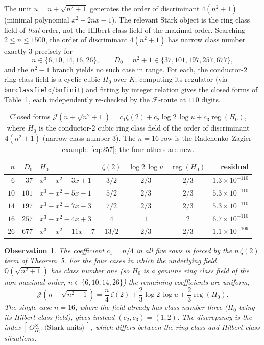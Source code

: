 \documentclass[11pt]{article}
\newtheorem{observation}{Observation}
\newcommand{\Jc}{\mathcal{J}}
\newcommand{\Fc}{\mathcal{F}}
\newcommand{\reg}{\operatorname{reg}}
\newcommand{\Q}{\mathbb{Q}}
\begin{document}
The unit $u=n+\sqrt{n^2+1}$ generates the order of discriminant $4(n^2+1)$
(minimal polynomial $x^2-2nx-1$). The relevant Stark object is the ring class
field of \emph{that} order, not the Hilbert class field of the maximal order.
Searching $2\le n\le1500$, the order of discriminant $4(n^2+1)$ has narrow class
number exactly $3$ precisely for
\[
  n\in\{6,10,14,16,26\},\qquad D_0=n^2+1\in\{37,101,197,257,677\},
\]
and the $n^2-1$ branch yields no such case in range. For each, the conductor-$2$
ring class field is a cyclic cubic $H_0$ over $K$; computing its regulator (via
\texttt{bnrclassfield}/\texttt{bnfinit}) and fitting by integer relation gives
the closed forms of Table~\ref{tab:family}, each independently re-checked by the
$\Fc$-route at $110$ digits.

\begin{table}[h]\centering
\begin{tabular}{rrlccc r}
\toprule
$n$ & $D_0$ & $H_0$ & $\zeta(2)$ & $\log2\,\log u$ & $\reg(H_0)$ & residual\\
\midrule
$6$  & $37$  & $x^3-x^2-3x+1$  & $3/2$  & $2/3$ & $2/3$ & $1.3\times10^{-110}$\\
$10$ & $101$ & $x^3-x^2-5x-1$  & $5/2$  & $2/3$ & $2/3$ & $5.3\times10^{-110}$\\
$14$ & $197$ & $x^3-x^2-7x-3$  & $7/2$  & $2/3$ & $2/3$ & $5.3\times10^{-110}$\\
$16$ & $257$ & $x^3-x^2-4x+3$  & $4$    & $1$   & $2$   & $6.7\times10^{-110}$\\
$26$ & $677$ & $x^3-x^2-11x-7$ & $13/2$ & $2/3$ & $2/3$ & $1.1\times10^{-109}$\\
\bottomrule
\end{tabular}
\caption{Closed forms $\Jc(n+\sqrt{n^2+1})=c_1\zeta(2)+c_2\log2\,\log u+c_3\reg(H_0)$,
where $H_0$ is the conductor-$2$ cubic ring class field of the order of
discriminant $4(n^2+1)$ (narrow class number $3$). The $n=16$ row is the
Radchenko--Zagier example~\eqref{eq:257}; the four others are new.}
\label{tab:family}
\end{table}

\begin{observation}
The coefficient $c_1=n/4$ in all five rows is forced by the $n\,\zeta(2)$ term of
Theorem~5. For the four cases in which the underlying field
$\Q(\sqrt{n^2+1})$ has class number one (so $H_0$ is a genuine ring class field
of the non-maximal order, $n\in\{6,10,14,26\}$) the remaining coefficients are
\emph{uniform},
\[
  \Jc(n+\sqrt{n^2+1})=\frac n4\,\zeta(2)+\frac23\log2\,\log u+\frac23\reg(H_0).
\]
The single case $n=16$, where the field already has class number three
($H_0$ being its Hilbert class field), gives instead $(c_2,c_3)=(1,2)$. The
discrepancy is the index $[\,O_{H_0}^\times:\langle\text{Stark units}\rangle\,]$,
which differs between the ring-class and Hilbert-class situations.
\end{observation}
\end{document}

